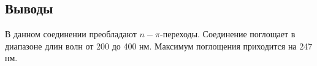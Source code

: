 \subsection{Выводы}
В данном соединении преобладают $n-\pi$-переходы. Соединение поглощает в диапазоне длин волн от 200 до 400 нм. Максимум поглощения приходится на 247 нм.